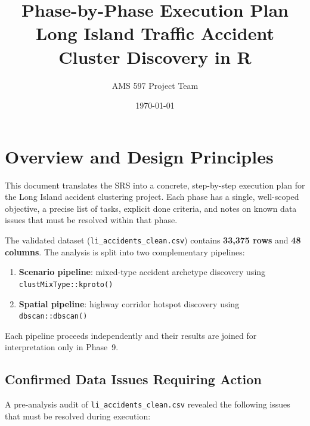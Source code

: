 \documentclass[11pt]{article}
\title{Phase-by-Phase Execution Plan\\Long Island Traffic Accident Cluster Discovery in R}
\author{AMS 597 Project Team}
\date{\today}
\begin{document}
\maketitle
\tableofcontents
\newpage

\section{Overview and Design Principles}

This document translates the SRS into a concrete, step-by-step execution plan for the Long Island accident clustering project. Each phase has a single, well-scoped objective, a precise list of tasks, explicit done criteria, and notes on known data issues that must be resolved within that phase.

The validated dataset (\texttt{li\_accidents\_clean.csv}) contains \textbf{33,375 rows} and \textbf{48 columns}. The analysis is split into two complementary pipelines:

\begin{enumerate}
  \item \textbf{Scenario pipeline}: mixed-type accident archetype discovery using \texttt{clustMixType::kproto()}
  \item \textbf{Spatial pipeline}: highway corridor hotspot discovery using \texttt{dbscan::dbscan()}
\end{enumerate}

Each pipeline proceeds independently and their results are joined for interpretation only in Phase~9.

\subsection{Confirmed Data Issues Requiring Action}

A pre-analysis audit of \texttt{li\_accidents\_clean.csv} revealed the following issues that must be resolved during execution:
\end{document}
